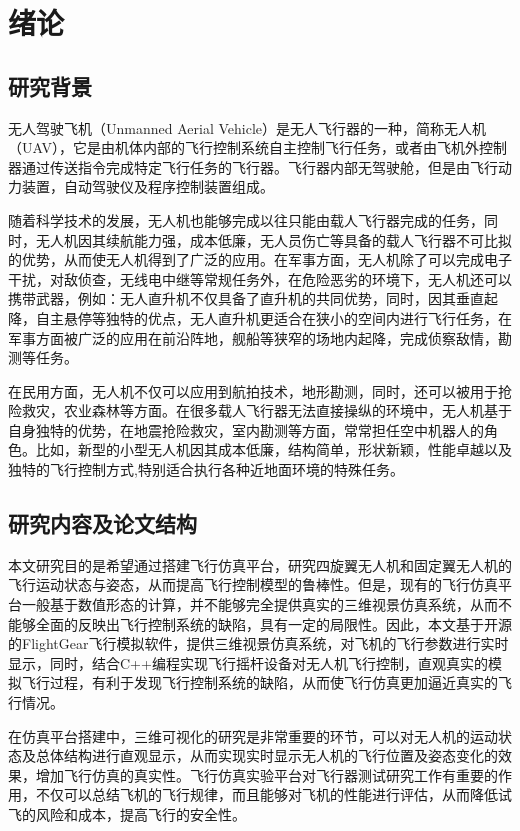 
\chapter{绪论}\label{preface}

\section{研究背景}
无人驾驶飞机（Unmanned Aerial Vehicle）是无人飞行器的一种，简称无人机（UAV），它是由机体内部的飞行控制系统自主控制飞行任务，或者由飞机外控制器通过传送指令完成特定飞行任务的飞行器。飞行器内部无驾驶舱，但是由飞行动力装置，自动驾驶仪及程序控制装置组成。

随着科学技术的发展，无人机也能够完成以往只能由载人飞行器完成的任务，同时，无人机因其续航能力强，成本低廉，无人员伤亡等具备的载人飞行器不可比拟的优势，从而使无人机得到了广泛的应用。在军事方面，无人机除了可以完成电子干扰，对敌侦查，无线电中继等常规任务外，在危险恶劣的环境下，无人机还可以携带武器，例如：无人直升机不仅具备了直升机的共同优势，同时，因其垂直起降，自主悬停等独特的优点，无人直升机更适合在狭小的空间内进行飞行任务，在军事方面被广泛的应用在前沿阵地，舰船等狭窄的场地内起降，完成侦察敌情，勘测等任务\cite{yuyanping2010}。

在民用方面，无人机不仅可以应用到航拍技术，地形勘测，同时，还可以被用于抢险救灾，农业森林等方面。在很多载人飞行器无法直接操纵的环境中，无人机基于自身独特的优势，在地震抢险救灾，室内勘测等方面，常常担任空中机器人的角色。比如，新型的小型无人机因其成本低廉，结构简单，形状新颖，性能卓越以及独特的飞行控制方式\cite{liupeng2011},特别适合执行各种近地面环境的特殊任务。

\section{研究内容及论文结构}
本文研究目的是希望通过搭建飞行仿真平台，研究四旋翼无人机和固定翼无人机的飞行运动状态与姿态，从而提高飞行控制模型的鲁棒性。但是，现有的飞行仿真平台一般基于数值形态的计算，并不能够完全提供真实的三维视景仿真系统，从而不能够全面的反映出飞行控制系统的缺陷，具有一定的局限性。因此，本文基于开源的FlightGear飞行模拟软件，提供三维视景仿真系统，对飞机的飞行参数进行实时显示，同时，结合C++编程实现飞行摇杆设备对无人机飞行控制，直观真实的模拟飞行过程，有利于发现飞行控制系统的缺陷，从而使飞行仿真更加逼近真实的飞行情况。

在仿真平台搭建中，三维可视化的研究是非常重要的环节，可以对无人机的运动状态及总体结构进行直观显示\cite{lihaiquan2011}，从而实现实时显示无人机的飞行位置及姿态变化的效果，增加飞行仿真的真实性。飞行仿真实验平台对飞行器测试研究工作有重要的作用，不仅可以总结飞机的飞行规律，而且能够对飞机的性能进行评估，从而降低试飞的风险和成本，提高飞行的安全性。

